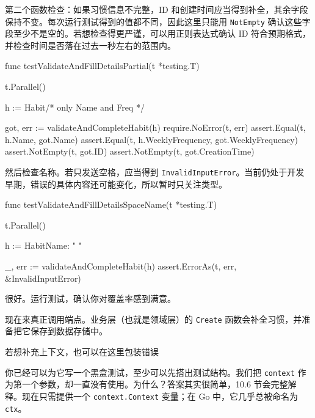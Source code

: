 第二个函数检查：如果习惯信息不完整，ID 和创建时间应当得到补全，其余字段保持不变。每次运行测试得到的值都不同，因此这里只能用 \texttt{NotEmpty} 确认这些字段至少不是空的。若想检查得更严谨，可以用正则表达式确认 ID 符合预期格式，并检查时间是否落在过去一秒左右的范围内。

\begin{gocode}[]
func testValidateAndFillDetailsPartial(t *testing.T) {
    t.Parallel()

    h := Habit{/* only Name and Freq */}

    got, err := validateAndCompleteHabit(h)
    require.NoError(t, err)
    assert.Equal(t, h.Name, got.Name)
    assert.Equal(t, h.WeeklyFrequency, got.WeeklyFrequency)
    assert.NotEmpty(t, got.ID)
    assert.NotEmpty(t, got.CreationTime)
}
\end{gocode}

然后检查名称。若只发送空格，应当得到 \texttt{InvalidInputError}。当前仍处于开发早期，错误的具体内容还可能变化，所以暂时只关注类型。

\begin{gocode}[]
func testValidateAndFillDetailsSpaceName(t *testing.T) {
    t.Parallel()

    h := Habit{Name: "    "}

    _, err := validateAndCompleteHabit(h)
    assert.ErrorAs(t, err, &InvalidInputError{})
}
\end{gocode}

很好。运行测试，确认你对覆盖率感到满意。

现在来真正调用端点。业务层（也就是领域层）的 \texttt{Create} 函数会补全习惯，并准备把它保存到数据存储中。


\begin{codeannotations}
\item 若想补充上下文，也可以在这里包装错误
\end{codeannotations}

你已经可以为它写一个黑盒测试，至少可以先搭出测试结构。我们把 \texttt{context} 作为第一个参数，却一直没有使用。为什么？答案其实很简单，10.6 节会完整解释。现在只需提供一个 \texttt{context.Context} 变量；在 Go 中，它几乎总被命名为 \texttt{ctx}。

